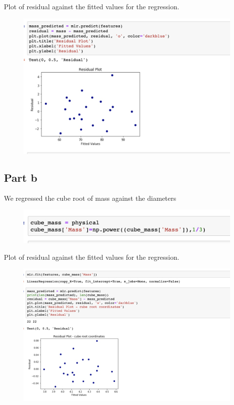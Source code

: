 \documentclass{article}      %
\begin{document}
Plot of residual against the fitted values for the regression.

\begin{figure}[H]
\centering
\includegraphics[width=\textwidth]{part7}
\end{figure}


\subsection{Part b}

We regressed the cube root of mass against the diameters

\begin{figure}[H]
\centering
\includegraphics[width=\textwidth]{part8}
\end{figure}

Plot of residual against the fitted values for the regression.

\begin{figure}[H]
\centering
\includegraphics[width=\textwidth]{part9}
\end{figure}
\end{document}
